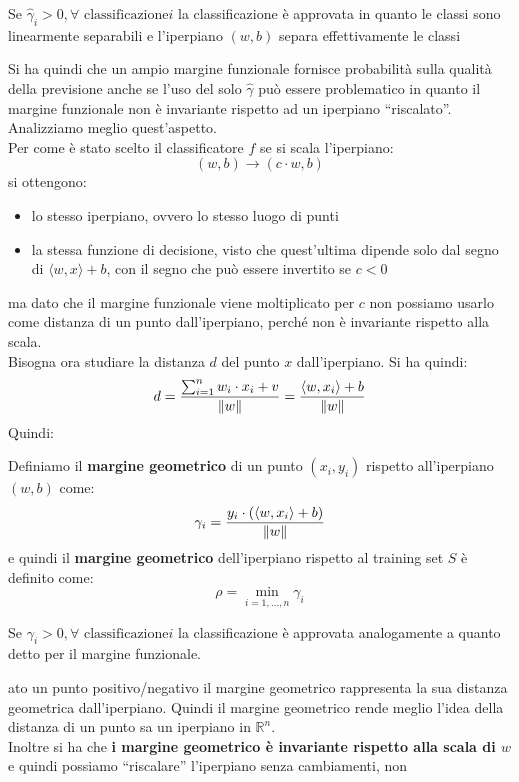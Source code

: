 \begin{teorema}
  Se $\hat{\gamma}_i>0,\forall \mbox{ classificazione} i$ la classificazione è
  approvata in quanto le classi sono linearmente separabili e l'iperpiano
  $(w,b)$ separa effettivamente le classi
\end{teorema}
Si ha quindi che un ampio margine funzionale fornisce probabilità sulla qualità
della previsione anche se l'uso del solo $\hat{\gamma}$ può essere problematico
in quanto il margine funzionale non è invariante rispetto ad un iperpiano
``riscalato''. Analizziamo meglio quest'aspetto.\\
Per come è stato scelto il classificatore $f$ se si scala l'iperpiano:
\[(w,b)\to(c\cdot w,b)\]
si ottengono:
\begin{itemize}
  \item lo stesso iperpiano, ovvero lo stesso luogo di punti
  \item la stessa funzione di decisione, visto che quest'ultima dipende solo dal
  segno di $\langle w,x\rangle+b$, con il segno che può essere invertito se
  $c<0$ 
\end{itemize}
ma dato che il margine funzionale viene moltiplicato per $c$ non possiamo usarlo
come distanza di un punto dall’iperpiano, perché non è invariante rispetto alla
scala.\\
Bisogna ora studiare la distanza $d$ del punto $x$ dall'iperpiano. Si ha quindi:
\[d = \frac{\sum_{i=1}^n w_i\cdot x_i+v}{\norm{w}}=\frac{\langle w,
    x_i\rangle +b}{\norm{w}} \]
Quindi:
\begin{definizione}
  Definiamo il \textbf{margine geometrico} di un punto $(x_i,y_i)$ rispetto
  all'iperpiano $(w,b)$ come:
  \[\gamma_i=\frac{y_i\cdot(\langle w,x_i\rangle+b)}{\norm{w}}\]
  e quindi il \textbf{margine geometrico} dell'iperpiano rispetto al training
  set $S$ è definito come:
  \[\rho=\min_{i=1,\ldots, n}\gamma_i\]
\end{definizione}
\begin{teorema}
  Se $\gamma_i>0,\forall \mbox{ classificazione} i$ la classificazione è
  approvata analogamente a quanto detto per il margine funzionale.
\end{teorema}
ato un punto positivo/negativo il margine geometrico rappresenta la sua
distanza geometrica dall'iperpiano. Quindi il margine geometrico rende meglio
l'idea della distanza di un punto sa un iperpiano in $\mathbb{R}^n$.\\
Inoltre si ha che \textbf{i margine geometrico è invariante rispetto alla scala
  di $w$} e quindi possiamo ``riscalare'' l'iperpiano senza cambiamenti, non
